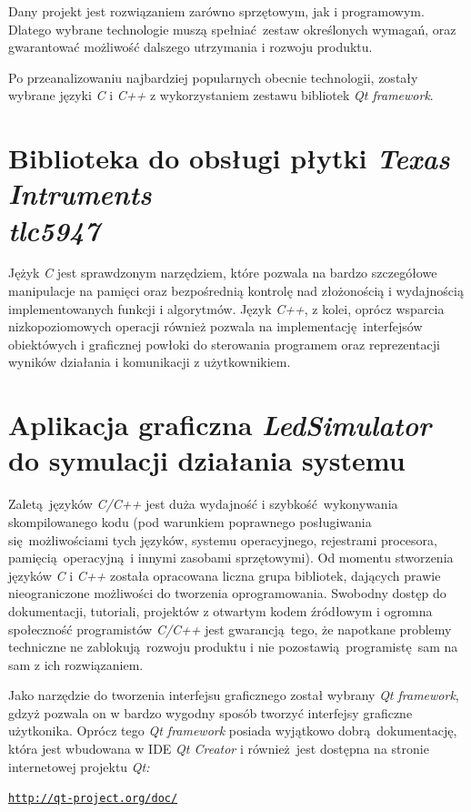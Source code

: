 \documentclass[eng,printmode]{mgr}
\begin{document}
Dany projekt jest rozwiązaniem zarówno sprzętowym, jak i programowym. Dlatego wybrane technologie muszą spełniać zestaw określonych wymagań, oraz gwarantować możliwość dalszego utrzymania i rozwoju produktu.

Po przeanalizowaniu najbardziej popularnych obecnie technologii, zostały wybrane języki \emph{C} i \emph{C++} z wykorzystaniem zestawu bibliotek \emph{Qt framework}.

\section{Biblioteka do obsługi płytki \emph{Texas Intruments \\ tlc5947}}
Jężyk \emph{C} jest sprawdzonym narzędziem, które pozwala na bardzo szczegółowe manipulacje na pamięci oraz bezpośrednią kontrolę nad złożonością i wydajnością implementowanych funkcji i algorytmów. Język \emph{C++}, z kolei, oprócz wsparcia nizkopoziomowych operacji również pozwala na implementację interfejsów obiektówych i graficznej powłoki do sterowania programem oraz reprezentacji wyników działania i komunikacji z użytkownikiem.


\section{Aplikacja graficzna \emph{LedSimulator} do symulacji działania systemu}
Zaletą języków \emph{C/C++} jest duża wydajność i szybkość wykonywania skompilowanego kodu (pod warunkiem poprawnego posługiwania się możliwościami tych języków, systemu operacyjnego, rejestrami procesora, pamięcią operacyjną i innymi zasobami sprzętowymi). Od momentu stworzenia języków \emph{C} i \emph{C++} została opracowana liczna grupa bibliotek, dających prawie nieograniczone możliwości do tworzenia oprogramowania. Swobodny dostęp do dokumentacji, tutoriali, projektów z otwartym kodem źródłowym i ogromna społeczność programistów \emph{C/C++} jest gwarancją tego, że napotkane problemy techniczne ne zablokują rozwoju produktu i nie pozostawią programistę sam na sam z ich rozwiązaniem.

Jako narzędzie do tworzenia interfejsu graficznego został wybrany \emph{Qt framework}, gdzyż pozwala on w bardzo wygodny sposób tworzyć interfejsy graficzne użytkonika. Oprócz tego \emph{Qt framework} posiada wyjątkowo dobrą dokumentację, która jest wbudowana w IDE \emph{Qt Creator} i również jest dostępna na stronie internetowej projektu \emph{Qt:} 

\begin{alltt}
    \url{http://qt-project.org/doc/}
\end{alltt}
\end{document}

